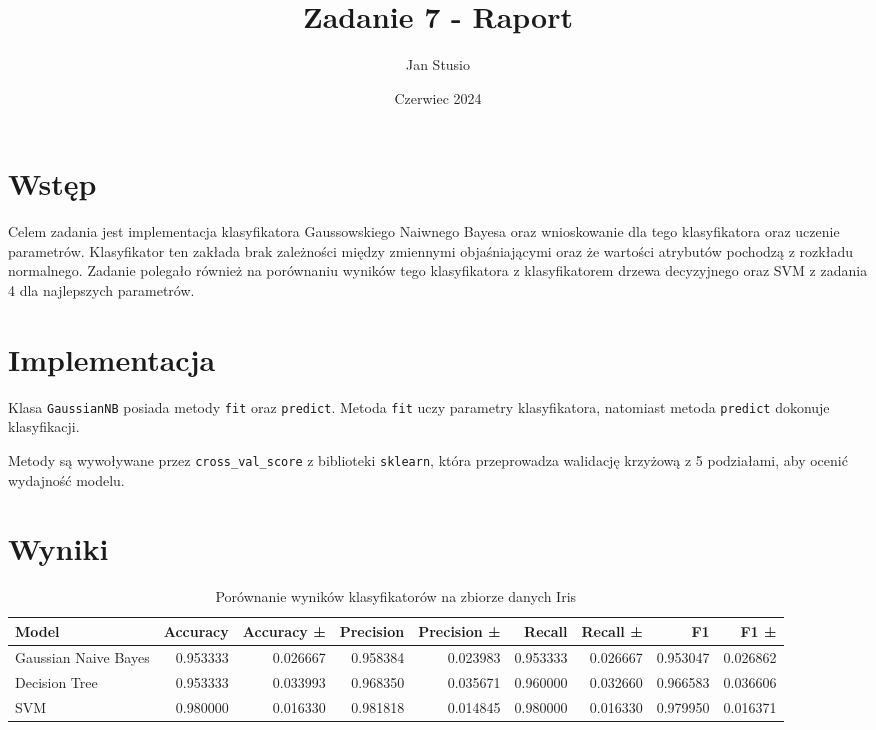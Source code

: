 \documentclass{article}
\title{Zadanie 7 - Raport}
\author{Jan Stusio}
\date{Czerwiec 2024}
\begin{document}
\maketitle

\section{Wstęp}

Celem zadania jest implementacja klasyfikatora Gaussowskiego Naiwnego Bayesa oraz wnioskowanie dla tego klasyfikatora oraz uczenie parametrów. 
Klasyfikator ten zakłada brak zależności między zmiennymi objaśniającymi oraz że wartości atrybutów pochodzą z rozkładu normalnego. 
Zadanie polegało również na porównaniu wyników tego klasyfikatora z klasyfikatorem drzewa decyzyjnego oraz SVM z zadania 4 dla najlepszych parametrów.

\section{Implementacja}

Klasa \texttt{GaussianNB} posiada metody \texttt{fit} oraz \texttt{predict}. 
Metoda \texttt{fit} uczy parametry klasyfikatora, natomiast metoda \texttt{predict} dokonuje klasyfikacji. 

Metody są wywoływane przez \texttt{cross\_val\_score} z biblioteki \texttt{sklearn}, która przeprowadza walidację krzyżową z 5 podziałami, aby ocenić wydajność modelu.

\section{Wyniki}

\begin{table}[h!]
    \centering
    \begin{tabular}{lrrrrrrrr}
        \toprule
        Model & Accuracy & Accuracy ± & Precision & Precision ± & Recall & Recall ± & F1 & F1 ± \\
        \midrule
        Gaussian Naive Bayes & 0.953333 & 0.026667 & 0.958384 & 0.023983 & 0.953333 & 0.026667 & 0.953047 & 0.026862 \\
        Decision Tree & 0.953333 & 0.033993 & 0.968350 & 0.035671 & 0.960000 & 0.032660 & 0.966583 & 0.036606 \\
        SVM & 0.980000 & 0.016330 & 0.981818 & 0.014845 & 0.980000 & 0.016330 & 0.979950 & 0.016371 \\
        \bottomrule
    \end{tabular}
    \caption{Porównanie wyników klasyfikatorów na zbiorze danych Iris}
\end{table}
\end{document}
